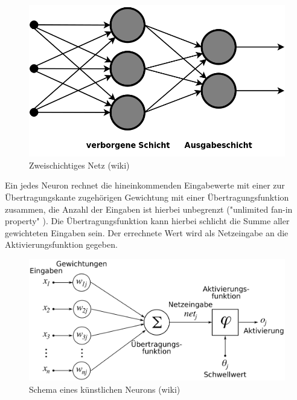\documentclass[
	12pt,
	a4paper,
	BCOR10mm,
	DIV14,
	listof=totoc,
	bibliography=totoc,
	headsepline
]{scrreprt}
\begin{document}
\begin{figure}[h]
	\begin{center}
		\includegraphics[totalheight=0.2\textheight]{Bilder/Multi-Layer_Neural_Network-Vector.png}
	\end{center}
	\caption{Zweischichtiges Netz (wiki)}
	\label{fig:Schichten}
\end{figure}
Ein jedes Neuron rechnet die hineinkommenden Eingabewerte mit einer zur Übertragungskante zugehörigen Gewichtung mit einer Übertragungsfunktion zusammen, die Anzahl der Eingaben ist hierbei unbegrenzt ("unlimited fan-in property" \cite{Rojas:1996:NNS:235222}). Die Übertragungsfunktion kann hierbei schlicht die Summe aller gewichteten Eingaben sein. Der errechnete Wert wird als Netzeingabe an die Aktivierungsfunktion gegeben. 
\\
\begin{figure}[h]
	\begin{center}
		\includegraphics[totalheight=0.2\textheight]{Bilder/ArtificialNeuronModel_deutsch.png}
	\end{center}
	\caption{Schema eines künstlichen Neurons (wiki)}
	\label{fig:Neuron}
\end{figure} \\
\end{document}
